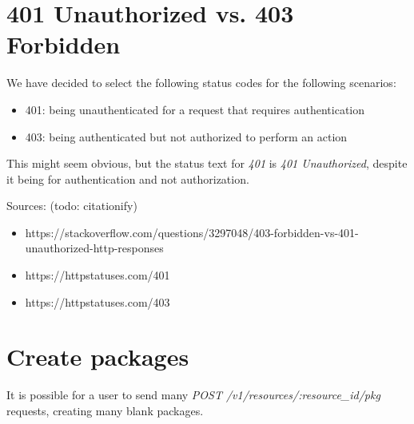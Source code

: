 \documentclass[bsc,frontabs,twoside,singlespacing,parskip,deptreport]{infthesis}     %
\begin{document}
\section{401 Unauthorized vs. 403 Forbidden}

We have decided to select the following status codes for the following scenarios:

\begin{itemize}
  \item 401: being unauthenticated for a request that requires authentication
  \item 403: being authenticated but not authorized to perform an action
\end{itemize}

This might seem obvious, but the status text for \emph{401} is \emph{401 Unauthorized},
despite it being for authentication and not authorization.

Sources: (todo: citationify)
\begin{itemize}
  \item https://stackoverflow.com/questions/3297048/403-forbidden-vs-401-unauthorized-http-responses
  \item https://httpstatuses.com/401
  \item https://httpstatuses.com/403
\end{itemize}

\section{Create packages}

It is possible for a user to send many \emph{POST /v1/resources/:resource\_id/pkg} requests, creating many blank packages.






\end{document}
